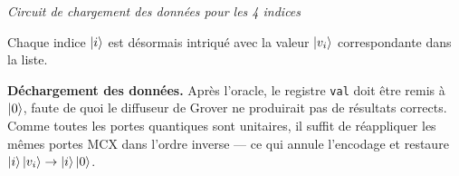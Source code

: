 \documentclass{ceri/sty/rapport}
\begin{document}
\smallskip
\noindent{}

\smallskip
\begin{center}
{\small\textit{Circuit de chargement des données pour les 4 indices}}
\end{center}

\smallskip
Chaque indice $\ket{i}$ est désormais intriqué avec la valeur $\ket{v_i}$
correspondante dans la liste.

\medskip
\textbf{Déchargement des données.}
Après l'oracle, le registre \texttt{val} doit être remis à $\ket{0}$, faute de quoi le diffuseur de Grover ne produirait pas de résultats corrects. Comme toutes les portes quantiques sont
unitaires, il suffit de réappliquer les mêmes portes MCX dans l'ordre inverse —
ce qui annule l'encodage et restaure $\ket{i}\ket{v_i} \to \ket{i}\ket{0}$.

\medskip
\end{document}
